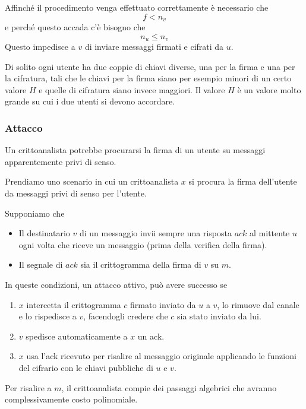 Affinch\'e il procedimento venga effettuato correttamente \`e necessario che
\[ f < n_v \]
e perch\'e questo accada c'\`e bisogno che
\[ n_u \leq n_v \]
Questo impedisce a $v$ di inviare messaggi firmati e cifrati da $u$.

Di solito ogni utente ha due coppie di chiavi diverse, una per la firma e una per la cifratura, tali che le chiavi
per la firma siano per esempio minori di un certo valore $H$ e quelle di cifratura siano invece maggiori. Il valore
$H$ \`e un valore molto grande su cui i due utenti si devono accordare.

\subsubsection{Attacco}
Un crittoanalista potrebbe procurarsi la firma di un utente su messaggi apparentemente privi di senso.

Prendiamo uno scenario in cui un crittoanalista $x$ si procura la firma dell'utente da messaggi privi di senso
per l'utente.

Supponiamo che
\begin{itemize}
	\item Il destinatario $v$ di un messaggio invii sempre una risposta $ack$ al mittente $u$ ogni volta che
	      riceve un messaggio (prima della verifica della firma).
	\item Il segnale di $ack$ sia il crittogramma della firma di $v$ su $m$.
\end{itemize}
In queste condizioni, un attacco attivo, pu\`o avere successo se
\begin{enumerate}
	\item $x$ intercetta il crittogramma $c$ firmato inviato da $u$ a $v$, lo rimuove dal canale e lo rispedisce a
	      $v$, facendogli credere che $c$ sia stato inviato da lui.
	\item $v$ spedisce automaticamente a $x$ un ack.
	\item $x$ usa l'ack ricevuto per risalire al messaggio originale applicando le funzioni del cifrario con le
	      chiavi pubbliche di $u$ e $v$.
\end{enumerate}
Per risalire a $m$, il crittoanalista compie dei passaggi algebrici che avranno complessivamente costo polinomiale.


